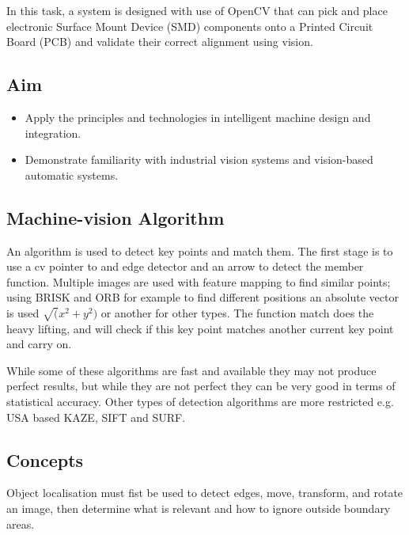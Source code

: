 \documentclass[a4paper, 10pt]{IEEEconf}
\begin{document}
In this task, a system is designed with use of OpenCV that can pick and place electronic Surface Mount Device (SMD) components onto a Printed Circuit Board (PCB) and validate their correct alignment using vision.


\subsection{Aim}
\begin{itemize}
	\item Apply the principles and technologies in intelligent machine design and integration.
	\item Demonstrate familiarity with industrial vision systems and vision-based automatic systems.
\end{itemize}

\subsection{Machine-vision Algorithm}
An algorithm is used to detect key points and match them. The first stage is to use a cv pointer to and edge detector and an arrow to detect the member function. Multiple images are used with feature mapping to find similar points; using BRISK and ORB for example to find different positions an absolute vector is used $\sqrt(x^2+y^2)$ or another for other types. The function match does the heavy lifting, and will check if this key point matches another current key point and carry on.

While some of these algorithms are fast and available they may not produce perfect results, but while they are not perfect they can be very good in terms of statistical accuracy. Other types of detection algorithms are more restricted e.g. USA based KAZE, SIFT and SURF.

\subsection{Concepts}
Object localisation must fist be used to detect edges, move, transform, and rotate an image, then determine what is relevant and how to ignore outside boundary areas.
\end{document}
